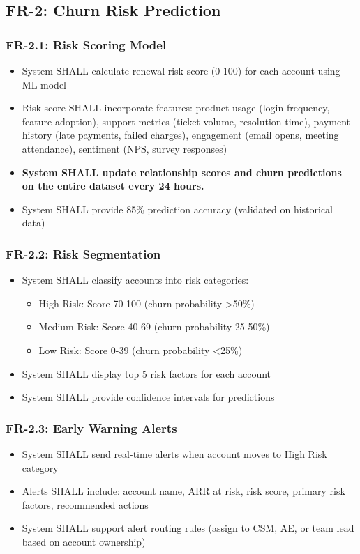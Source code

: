 \documentclass[12pt,a4paper]{article}
\begin{document}
\subsection{FR-2: Churn Risk Prediction}
\subsubsection{FR-2.1: Risk Scoring Model}
\begin{itemize}
    \item System SHALL calculate renewal risk score (0-100) for each account using ML model
    \item Risk score SHALL incorporate features: product usage (login frequency, feature adoption), support metrics (ticket volume, resolution time), payment history (late payments, failed charges), engagement (email opens, meeting attendance), sentiment (NPS, survey responses)
    \item \textbf{System SHALL update relationship scores and churn predictions on the entire dataset every 24 hours.}
    \item System SHALL provide 85\% prediction accuracy (validated on historical data)
\end{itemize}
\subsubsection{FR-2.2: Risk Segmentation}
\begin{itemize}
    \item System SHALL classify accounts into risk categories:
    \begin{itemize}
        \item High Risk: Score 70-100 (churn probability >50\%)
        \item Medium Risk: Score 40-69 (churn probability 25-50\%)
        \item Low Risk: Score 0-39 (churn probability <25\%)
    \end{itemize}
    \item System SHALL display top 5 risk factors for each account
    \item System SHALL provide confidence intervals for predictions
\end{itemize}
\subsubsection{FR-2.3: Early Warning Alerts}
\begin{itemize}
    \item System SHALL send real-time alerts when account moves to High Risk category
    \item Alerts SHALL include: account name, ARR at risk, risk score, primary risk factors, recommended actions
    \item System SHALL support alert routing rules (assign to CSM, AE, or team lead based on account ownership)
\end{itemize}
\end{document}
